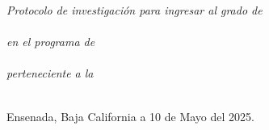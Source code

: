 \documentclass[
12pt, %
singlespacing, %
headsepline, %
]{MastersDoctoralThesis} %
\begin{document}
\begin{titlepage}
\begin{center}

\large \textit{Protocolo de investigación para ingresar al grado de\\\degreename}\\[0.5cm] %
\textit{en el programa de}\\\deptname\\[0.5cm]
\textit{perteneciente a la}\\\facname\\[0.5cm] %

\vfill

\begin{flushright}
{\small Ensenada, Baja California a 10 de Mayo del 2025.}\\[2cm] %
\end{flushright}

\end{center}
\end{titlepage}



\end{document}
